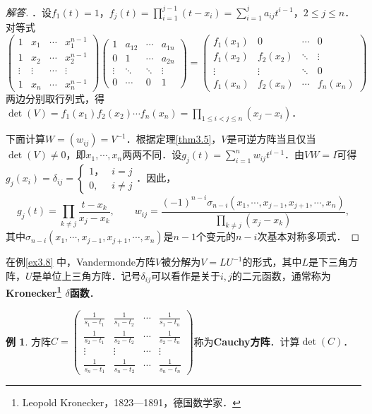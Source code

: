 \documentclass[a4paper,fontset=windows]{ctexbook}
\theoremstyle{definition}
\newtheorem{example}{例}[chapter]
\renewcommand{\le}{\leqslant}
\begin{document}
\begin{proof}[解答]
．设$f_1(t)=1$，$f_j(t)=\prod\limits_{i=1}^{j-1}(t-x_i)=\sum\limits_{i=1}^ja_{ij}t^{i-1}$，$2\le j\le n$．对等式
$$\begin{pmatrix}1&x_1&\cdots&x_1^{n-1} \\ 1&x_2&\cdots&x_2^{n-1} \\ \vdots&\vdots&\cdots&\vdots \\ 1&x_n&\cdots&x_n^{n-1}\end{pmatrix}\begin{pmatrix}1&a_{12}&\cdots&a_{1n} \\ 0&1&\cdots&a_{2n} \\ \vdots&\ddots&\ddots&\vdots \\ 0&\cdots&0&1\end{pmatrix}=\begin{pmatrix}f_1(x_1)&0&\cdots&0 \\ f_1(x_2)&f_2(x_2)&\ddots&\vdots \\ \vdots&\vdots&\ddots&0 \\ f_1(x_n)&f_2(x_n)&\cdots&f_n(x_n)\end{pmatrix}$$
两边分别取行列式，得$\det(V)=f_1(x_1)f_2(x_2)\cdots f_n(x_n)=\prod\limits_{1\le i<j\le n}(x_j-x_i)$．

下面计算$W=(w_{ij})=V^{-1}$．根据定理\ref{thm3.5}，$V$是可逆方阵当且仅当$\det(V)\ne 0$，即$x_1,\cdots,x_n$两两不同．设$g_j(t)=\sum\limits_{i=1}^nw_{ij}t^{i-1}$．由$VW=I$可得$g_j(x_i)=\delta_{ij}=\begin{cases}1，&i=j \\ 0,&i\ne j\end{cases}$．因此，
$$g_j(t)=\prod_{k\ne j}\frac{t-x_k}{x_j-x_k},\qquad w_{ij}=\frac{(-1)^{n-i}\sigma_{n-i}(x_1,\cdots,x_{j-1},x_{j+1},\cdots,x_n)}{\prod\limits_{k\ne j}(x_j-x_k)},$$
其中$\sigma_{n-i}(x_1,\cdots,x_{j-1},x_{j+1},\cdots,x_n)$是$n-1$个变元的$n-i$次基本对称多项式．
\end{proof}

在例\ref{ex3.8} 中，Vandermonde方阵$V$被分解为$V=LU^{-1}$的形式，其中$L$是下三角方阵，$U$是单位上三角方阵．记号$\delta_{ij}$可以看作是关于$i,j$的二元函数，通常称为{\bf Kronecker\footnote{Leopold Kronecker，1823—1891，德国数学家．} $\delta$函数}．

\begin{example}\label{ex3.9}
方阵$C=\begin{pmatrix}\frac{1}{s_1-t_1}&\frac{1}{s_1-t_2}&\cdots&\frac{1}{s_1-t_n} \\ \frac{1}{s_2-t_1}&\frac{1}{s_2-t_2}&\cdots&\frac{1}{s_2-t_n} \\ \vdots&\vdots&\cdots&\vdots \\ \frac{1}{s_n-t_1}&\frac{1}{s_n-t_2}&\cdots&\frac{1}{s_n-t_n}\end{pmatrix}$称为{\bf Cauchy方阵}．计算$\det(C)$．
\end{example}
\end{document}
